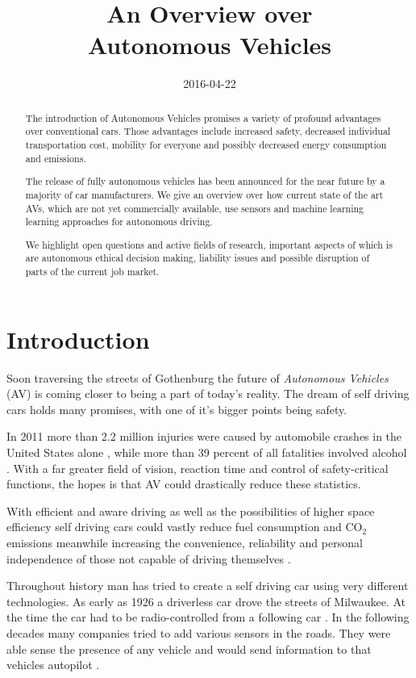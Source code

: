 \documentclass[11pt]{article}
\title{An Overview over \\ Autonomous Vehicles}
\date{2016-04-22}
\begin{document}
\maketitle
\begin{abstract}
The introduction of Autonomous Vehicles promises a variety of profound advantages over conventional cars. Those advantages include increased safety, decreased individual transportation cost, mobility for everyone and possibly decreased energy consumption and emissions. 

The release of fully autonomous vehicles has been announced for the near future by a majority of car manufacturers. We give an overview over how current state of the art AVs, which are not yet commercially available, use sensors and machine learning learning approaches for autonomous driving.

We highlight open questions and active fields of research, important aspects of which is are autonomous ethical decision making, liability issues and possible disruption of parts of the current job market.
\end{abstract}

\section{Introduction}
Soon traversing the streets of Gothenburg the future of \textit{Autonomous Vehicles} (AV) is coming closer to being a part of today's reality. The dream of self driving cars holds many promises, with one of it's bigger points being safety.

In 2011 more than 2.2 million injuries were caused by automobile crashes in the United States alone \cite[p. 14]{Anderson2014rand}, while more than 39 percent of all fatalities involved alcohol \cite[p. 16]{Anderson2014rand}. With a far greater field of vision, reaction time and control of safety-critical functions, the hopes is that AV could drastically reduce these statistics.

With efficient and aware driving as well as the possibilities of higher space efficiency self driving cars could vastly reduce fuel consumption and CO$_2$ emissions \cite[p. 28ff]{Anderson2014rand} meanwhile increasing the convenience, reliability and personal independence of those not capable of driving themselves \cite[p. 17]{Anderson2014rand}.

Throughout history man has tried to create a self driving car using very different technologies. As early as 1926 a driverless car drove the streets of Milwaukee. At the time the car had to be radio-controlled from a following car \cite{Sentinel1926Phantom}. In the following decades many companies tried to add various sensors in the roads. They were able sense the presence of any vehicle and would send information to that vehicles autopilot \cite{Courier1960Driverless}.
\end{document}
